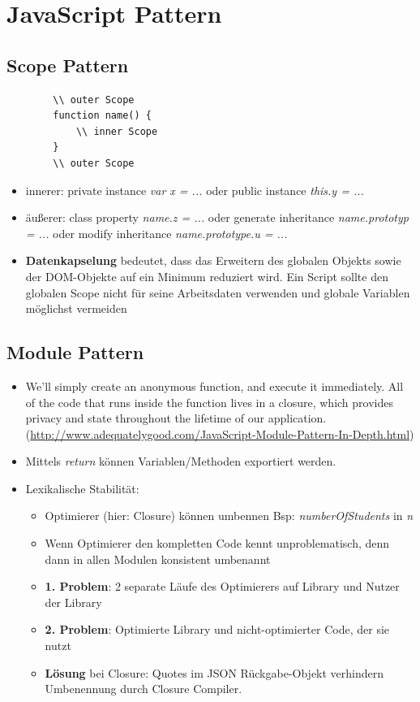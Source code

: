 \documentclass{article} %
\begin{document}
\section{JavaScript Pattern}
	\subsection{Scope Pattern}
		\begin{lstlisting}
		\\ outer Scope
		function name() {
			\\ inner Scope
		}
		\\ outer Scope
		\end{lstlisting}
	
		\begin{itemize}
			\item innerer: 
			private instance \textit{var x = ...} oder 
			public instance \textit{this.y = ...}
			\item äußerer: 
			class property \textit{name.z = ...} oder
			generate inheritance \textit{name.prototyp = ...} oder
			modify inheritance \textit{name.prototype.u = ...}
			\item \textbf{Datenkapselung} bedeutet, dass das Erweitern des globalen Objekts sowie der DOM-Objekte auf ein Minimum reduziert wird. Ein Script sollte den globalen Scope nicht für seine Arbeitsdaten verwenden und globale Variablen möglichst vermeiden
		\end{itemize}
		\subsection{Module Pattern}
		\begin{itemize}
			\item We’ll simply create an anonymous function, and execute it immediately. All of the code that runs inside the function lives in a closure, which provides privacy and state throughout the lifetime of our application.\\
			(\url{http://www.adequatelygood.com/JavaScript-Module-Pattern-In-Depth.html})
			\item Mittels \textit{return} können Variablen/Methoden exportiert werden.
			\item Lexikalische Stabilität: 
			\begin{itemize}
				\item Optimierer (hier: Closure) können umbennen Bsp: \textit{numberOfStudents} in \textit{n}
				\item Wenn Optimierer den kompletten Code kennt unproblematisch, denn dann in allen Modulen konsistent umbenannt
				\item \textbf{1. Problem}: 2 separate Läufe des Optimierers auf Library und Nutzer der Library
				\item \textbf{2. Problem}: Optimierte Library und nicht-optimierter Code, der sie nutzt
				\item \textbf{Lösung} bei Closure: Quotes im JSON Rückgabe-Objekt verhindern Umbenennung durch Closure Compiler.
			\end{itemize}
		\end{itemize}
\end{document}
